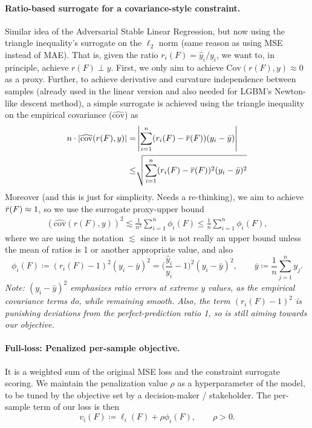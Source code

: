 \documentclass[11pt]{article}
\newcommand{\yh}{\hat y}
\theoremstyle{plain}
\theoremstyle{definition}
\newcommand{\1}{\mathbf{1}}
\begin{document}
\paragraph{Ratio-based surrogate for a covariance-style constraint.} Similar idea of the Adversarial Stable Linear Regression, but now using the triangle inequality's surrogate on the $\ell_2$ norm (same reason as using MSE instead of MAE). That is, given the ratio $r_i(F)=\yh_i/y_i$, we want to, in principle, achieve $r(F) \perp y$. First, we only aim to achieve $\mathrm{Cov}(r(F),y)\approx 0$ as a proxy. Further, to achieve derivative and curvature independence between samples (already used in the linear version and also needed for LGBM's Newton-like descent method), a simple surrogate is achieved using the triangle inequality on the empirical covariance ($\widehat{\text{cov}}$) as
\begin{align*}
    n \cdot |\widehat{\text{cov}}(r(F), y)| =& \left |\sum_{i=1}^n (r_i(F)-\overline{r}(F) )(y_i - \Bar{y}) \right|\\
    \leq & \sqrt{ \sum_{i=1}^n (r_i(F)-\overline{r}(F) )^2(y_i - \Bar{y})^2 }
\end{align*}
Moreover {\color{red} (and this is just for simplicity. Needs a re-thinking)}, we aim to achieve $\Bar{r}(F)\approx 1$, so we use the surrogate proxy-upper bound 
\begin{align}
    ( \widehat{\text{cov}}(r(F), y))^2 \lesssim  \frac{1}{n^2}\sum_{i=1}^n \phi_i(F) \leq  \frac{1}{n}\sum_{i=1}^n \phi_i(F),
\end{align}
where we are using the notation $\lesssim$ since it is not really an upper bound unless the mean of ratios is 1 or another appropriate value, and also
\begin{equation}
\phi_i(F) \coloneqq (r_i(F)-1)^2 (y_i-\bar y)^2
= \Big(\frac{\yh_i}{y_i}-1\Big)^2 (y_i-\bar y)^2,
\qquad \bar y \coloneqq \frac{1}{n}\sum_{j=1}^n y_j.
\label{eq:phisurr}
\end{equation}
\textit{Note: $(y_i-\bar y)^2$ emphasizes ratio errors at extreme $y$ values, as the empirical covariance terms do, while remaining smooth. Also, the term $(r_i(F)-1)^2$ is punishing deviations from the perfect-prediction ratio 1, so is still aiming towards our objective.}
\paragraph{Full-loss: Penalized per-sample objective.} It is a weighted sum of the original MSE loss and the constraint surrogate scoring. We maintain the penalization value $\rho$ as a hyperparameter of the model, to be tuned by the objective set by a decision-maker / stakeholder. The per-sample term of our loss is then 
\begin{equation}
v_i(F) \coloneqq \ell_i(F) + \rho \phi_i(F), \qquad \rho>0.
\label{eq:vi}
\end{equation}
\end{document}
